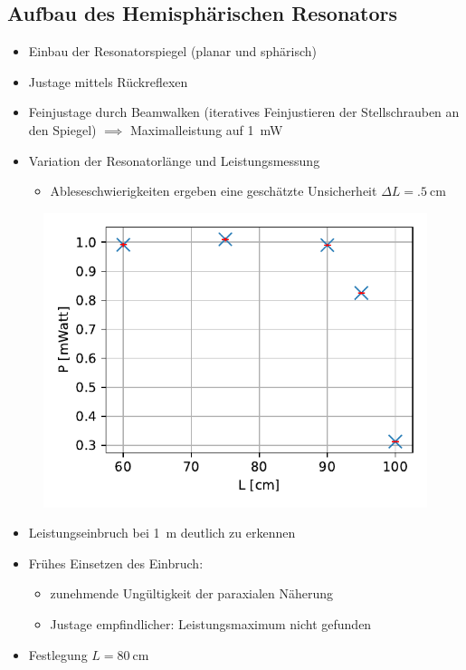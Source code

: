 \documentclass[10pt, aspectratio=169]{beamer}
\begin{document}
\subsection{Aufbau des Hemisph\"arischen Resonators}
\begin{frame}
  \begin{itemize}
  \item<1-> Einbau der Resonatorspiegel (planar und sph\"arisch)
  \item<2-> Justage mittels R\"uckreflexen
  \item<3-> Feinjustage durch Beamwalken (iteratives Feinjustieren der
    Stellschrauben an den Spiegel) \(\implies\) Maximalleistung auf
    \SI{1}{\milli\watt}
  \item<4-> Variation der Resonatorl\"ange und Leistungsmessung
    \begin{itemize}
    \item Ableseschwierigkeiten ergeben eine gesch\"atzte Unsicherheit
      \(\Delta L = \SI{.5}{\centi\meter}\)
    \end{itemize}
  \end{itemize}

\end{frame}

\begin{frame}
  \begin{figure}[H]\centering
    \includegraphics[width=.5\columnwidth]{figs/power-over-l.pdf}
  \end{figure}
  \begin{itemize}
  \item<1-> Leistungseinbruch bei \SI{1}{\meter} deutlich zu erkennen
  \item<2-> Fr\"uhes Einsetzen des Einbruch:
    \begin{itemize}
    \item zunehmende Ung\"ultigkeit der paraxialen N\"aherung
    \item Justage empfindlicher: Leistungsmaximum nicht gefunden
    \end{itemize}
  \item<3-> Festlegung \(L=\SI{80}{\centi\meter}\)
  \end{itemize}
\end{frame}
\end{document}
